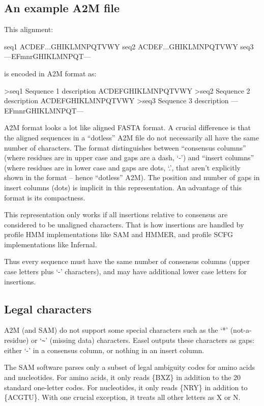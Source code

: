 \subsection{An example A2M file}

This alignment:

\begin{sreoutput}
seq1  ACDEF...GHIKLMNPQTVWY
seq2  ACDEF...GHIKLMNPQTVWY
seq3  ---EFmnrGHIKLMNPQT---
\end{sreoutput}

\noindent 
is encoded in A2M format as:

\begin{sreoutput}
>seq1  Sequence 1 description
ACDEFGHIKLMNPQTVWY
>seq2  Sequence 2 description
ACDEFGHIKLMNPQTVWY
>seq3  Sequence 3 description
---EFmnrGHIKLMNPQT---
\end{sreoutput}

A2M format looks a lot like aligned FASTA format. A crucial difference
is that the aligned sequences in a ``dotless'' A2M file do not
necessarily all have the same number of characters. The format
distinguishes between ``consensus columns'' (where residues are in
upper case and gaps are a dash, `-') and ``insert columns'' (where
residues are in lower case and gaps are dots, `.', that aren't
explicitly shown in the format -- hence ``dotless'' A2M). The position
and number of gaps in insert columns (dots) is implicit in this
representation.  An advantage of this format is its compactness.

This representation only works if all insertions relative to consensus
are considered to be unaligned characters. That is how insertions are
handled by profile HMM implementations like SAM and HMMER, and profile
SCFG implementations like Infernal.

Thus every sequence must have the same number of consensus columns
(upper case letters plus `-' characters), and may have additional lower
case letters for insertions.

\subsection{Legal characters}

A2M (and SAM) do not support some special characters such as the `*'
(not-a-residue) or `\verb+~+' (missing data) characters. Easel outputs these
characters as gaps: either `-' in a consensus column, or nothing in an
insert column.

The SAM software parses only a subset of legal ambiguity codes for
amino acids and nucleotides. For amino acids, it only reads \{BXZ\} in
addition to the 20 standard one-letter codes. For nucleotides, it only
reads \{NRY\} in addition to \{ACGTU\}. With one crucial exception, it
treats all other letters as X or N. 

